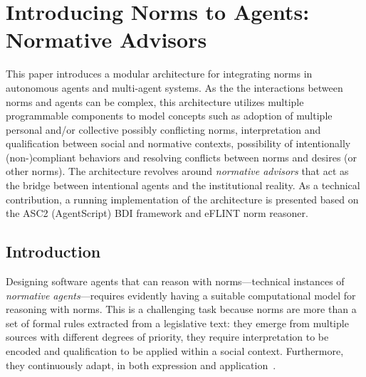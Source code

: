 \chapter{Introducing Norms to Agents: Normative Advisors}

This paper introduces a modular architecture for integrating norms in autonomous agents and multi-agent systems. As the the interactions between norms and agents can be complex, this architecture utilizes multiple programmable components to model concepts such as adoption of multiple personal and/or collective possibly conflicting norms, interpretation and qualification between social and normative contexts, possibility of intentionally (non-)compliant behaviors and resolving conflicts between norms and desires (or other norms). The architecture revolves around \emph{normative advisors} that act as the bridge between intentional agents and the institutional reality. As a technical contribution, a running implementation of the architecture is presented based on the ASC2 (AgentScript) BDI framework and eFLINT norm reasoner. 


\section{Introduction}
Designing software agents that can reason with norms---technical instances of \emph{normative agents}---requires evidently having a suitable computational model for reasoning with norms. This is a challenging task because norms are more than a set of formal rules extracted from a legislative text: they emerge from multiple sources with different degrees of priority, they require interpretation to be encoded and qualification to be applied within a social context. Furthermore, they continuously adapt, in both expression and application~\cite{Boella2014APractice}. 

